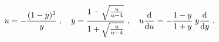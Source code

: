 \begin{equation}
u = - \frac{(1-y)^2}{y} \;, \quad  
y = \frac{1-\sqrt{\frac{u}{u-4}}}{1+\sqrt{\frac{u}{u-4}}} \;, \quad
u \frac{{\rm d}}{{\rm d} u} 
= -\frac{1-y}{1+y} \; y \frac{{\rm d}}{{\rm d}y}  \; . 
\label{y<->u}
\end{equation}

